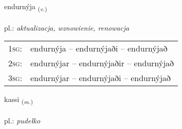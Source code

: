 \documentclass[frontgrid, backgrid]{flacards}\usepackage[]{graphicx}\usepackage[]{xcolor}
\begin{document}
\renewcommand{\flhead}{\vskip5pt \fboxsep=0pt {\small\bfseries\footnotesize Sagnorð | czasownik}}
\renewcommand{\fcfoot}{\vskip5pt \fboxsep=0pt \hspace{2pt}{\small\bfseries\footnotesize 3K}}

\renewcommand{\blhead}{\vskip5pt {\small\bfseries\footnotesize Sagnorð | czasownik }}
\renewcommand{\bcfoot}{\vskip5pt \hspace{2pt}{\small\bfseries\footnotesize 3K}}


{endurnýja \small{\textsubscript{(\textit{v.})}} \\[1ex] %
\textphonetic{[ɛntʏrnija]} \\
pl.: \emph{aktualizacja, wznowienie, renowacja} \\  [2ex]
\renewcommand*{\arraystretch}{0.8}
\begin{tabular}{p{1cm}l}
\textsc{1sg}: & endurnýja -- endurnýjaði -- endurnýjað \\ 
\textsc{2sg}: & endurnýjar -- endurnýjaðir -- endurnýjað \\ 
\textsc{3sg}: & endurnýjar -- endurnýjaði -- endurnýjað \\ 
\end{tabular}
}

\renewcommand{\flhead}{\vskip5pt \fboxsep=0pt {\small\bfseries\footnotesize Nafnorð | rzeczownik}}
\renewcommand{\fcfoot}{\vskip5pt \fboxsep=0pt \hspace{2pt}{\small\bfseries\footnotesize 3K}}

\renewcommand{\blhead}{\vskip5pt {\small\bfseries\footnotesize Nafnorð | rzeczownik }}
\renewcommand{\bcfoot}{\vskip5pt \hspace{2pt}{\small\bfseries\footnotesize 3K}}


{kassi \small{\textsubscript{(\textit{m.})}} \\[1ex] %
\textphonetic{[kʰasɪ]} \\
pl.: \emph{pudełko} \\  [2ex]
\renewcommand*{\arraystretch}{0.8}
}
\end{document}
